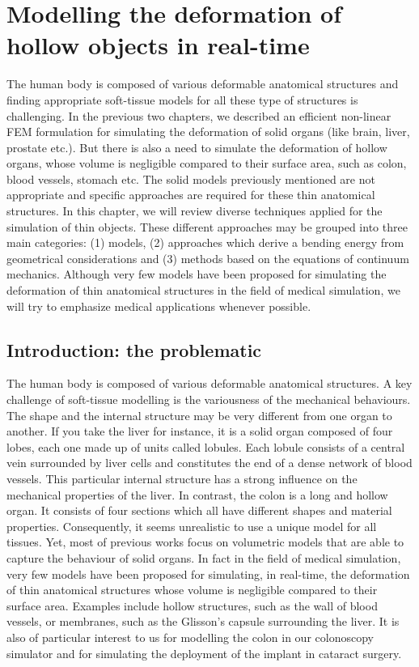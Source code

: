 \chapter{Modelling the deformation of hollow objects in real-time}
\label{chap7}
\begin{shortAbstract}
The human body is composed of various deformable anatomical structures and finding appropriate soft-tissue models for all these type of structures is challenging. In the previous two chapters, we described an efficient non-linear FEM formulation for simulating the deformation of solid organs (like brain, liver, prostate etc.). But there is also a need to simulate the deformation of hollow organs, whose volume is negligible compared to their surface area, such as colon, blood vessels, stomach etc. The solid models previously mentioned are not appropriate and specific approaches are required for these thin anatomical structures. In this chapter, we will review diverse techniques applied for the simulation of thin objects. These different approaches may be grouped into three main categories: (1) models, (2) approaches which derive a bending energy from geometrical considerations and (3) methods based on the equations of continuum mechanics. Although very few models have been proposed for simulating the deformation of thin anatomical structures in the field of medical simulation, we will try to emphasize medical applications whenever possible. 
\end{shortAbstract}


\section{Introduction: the problematic}
The human body is composed of various deformable anatomical structures. A key challenge of soft-tissue modelling is the variousness of the mechanical behaviours. The shape and the internal structure may be very different from one organ to another. If you take the liver for instance, it is a solid organ composed of four lobes, each one made up of units called lobules. Each lobule consists of a central vein surrounded by liver cells and constitutes the end of a dense network of blood vessels. This particular internal structure has a strong influence on the mechanical properties of the liver. In contrast, the colon is a long and hollow organ. It consists of four sections which all have different shapes and material properties. Consequently, it seems unrealistic to use a unique model for all tissues. Yet, most of previous works focus on volumetric models that are able to capture the behaviour of solid organs. In fact in the field of medical simulation, very few models have been proposed for simulating, in real-time, the deformation of thin anatomical structures whose volume is negligible compared to their surface area. Examples include hollow structures, such as the wall of blood vessels, or membranes, such as the Glisson's capsule surrounding the liver. It is also of particular interest to us for modelling the colon in our colonoscopy simulator and for simulating the deployment of the implant in cataract surgery. 

